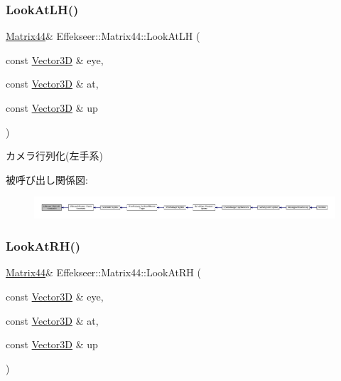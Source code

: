 \subsubsection{\texorpdfstring{Look\+At\+L\+H()}{LookAtLH()}}
{\footnotesize\ttfamily \mbox{\hyperlink{struct_effekseer_1_1_matrix44}{Matrix44}}\& Effekseer\+::\+Matrix44\+::\+Look\+At\+LH (\begin{DoxyParamCaption}\item[{const \mbox{\hyperlink{struct_effekseer_1_1_vector3_d}{Vector3D}} \&}]{eye,  }\item[{const \mbox{\hyperlink{struct_effekseer_1_1_vector3_d}{Vector3D}} \&}]{at,  }\item[{const \mbox{\hyperlink{struct_effekseer_1_1_vector3_d}{Vector3D}} \&}]{up }\end{DoxyParamCaption})}



カメラ行列化(左手系) 

被呼び出し関係図\+:
\nopagebreak
\begin{figure}[H]
\begin{center}
\leavevmode
\includegraphics[width=350pt]{struct_effekseer_1_1_matrix44_ade916ab8e0c99fe658b9d089d2bd55b9_icgraph}
\end{center}
\end{figure}
\mbox{\label{struct_effekseer_1_1_matrix44_aa27b9ef241d27851b1a28da82b529cb5}} 
\subsubsection{\texorpdfstring{Look\+At\+R\+H()}{LookAtRH()}}
{\footnotesize\ttfamily \mbox{\hyperlink{struct_effekseer_1_1_matrix44}{Matrix44}}\& Effekseer\+::\+Matrix44\+::\+Look\+At\+RH (\begin{DoxyParamCaption}\item[{const \mbox{\hyperlink{struct_effekseer_1_1_vector3_d}{Vector3D}} \&}]{eye,  }\item[{const \mbox{\hyperlink{struct_effekseer_1_1_vector3_d}{Vector3D}} \&}]{at,  }\item[{const \mbox{\hyperlink{struct_effekseer_1_1_vector3_d}{Vector3D}} \&}]{up }\end{DoxyParamCaption})}



